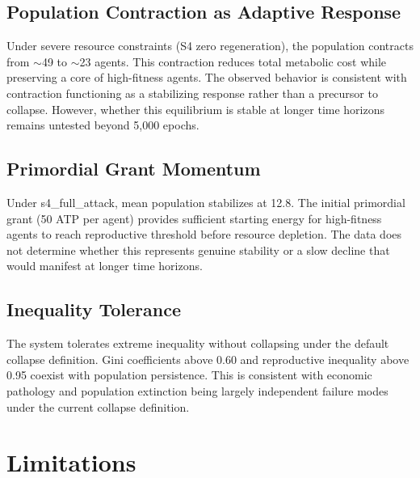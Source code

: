 \documentclass[11pt,a4paper]{article}
\begin{document}
\subsection{Population Contraction as Adaptive Response}

Under severe resource constraints (S4 zero regeneration), the population contracts from $\sim$49 to $\sim$23 agents. This contraction reduces total metabolic cost while preserving a core of high-fitness agents. The observed behavior is consistent with contraction functioning as a stabilizing response rather than a precursor to collapse. However, whether this equilibrium is stable at longer time horizons remains untested beyond 5,000 epochs.

\subsection{Primordial Grant Momentum}

Under s4\_full\_attack, mean population stabilizes at 12.8. The initial primordial grant (50 ATP per agent) provides sufficient starting energy for high-fitness agents to reach reproductive threshold before resource depletion. The data does not determine whether this represents genuine stability or a slow decline that would manifest at longer time horizons.

\subsection{Inequality Tolerance}

The system tolerates extreme inequality without collapsing under the default collapse definition. Gini coefficients above 0.60 and reproductive inequality above 0.95 coexist with population persistence. This is consistent with economic pathology and population extinction being largely independent failure modes under the current collapse definition.

\section{Limitations}\label{sec:limitations}
\end{document}
